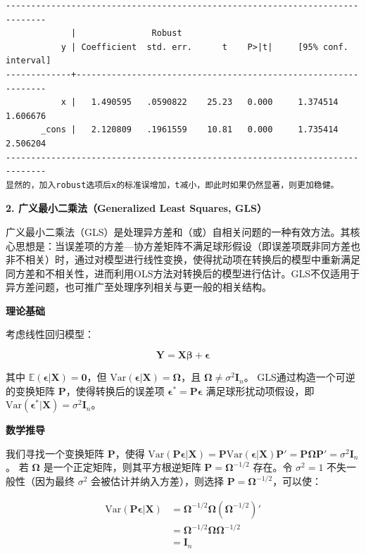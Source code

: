 \begin{tcolorbox}[title=在 Stata 中解决异方差问题, colback=white, colframe=black, colbacktitle=white, coltitle=black,fonttitle=\bfseries]
\begin{Verbatim}[commandchars=\\\{\},xleftmargin=2em]
------------------------------------------------------------------------------
             |               Robust
           y | Coefficient  std. err.      t    P>|t|     [95% conf. interval]
-------------+----------------------------------------------------------------
           x |   1.490595   .0590822    25.23   0.000     1.374514    1.606676
       _cons |   2.120809   .1961559    10.81   0.000     1.735414    2.506204
------------------------------------------------------------------------------
显然的，加入robust选项后x的标准误增加，t减小，即此时如果仍然显著，则更加稳健。
	\end{Verbatim}
\end{tcolorbox}

\textbf{2. 广义最小二乘法（Generalized Least Squares, GLS）}

广义最小二乘法（GLS）是处理异方差和（或）自相关问题的一种有效方法。其核心思想是：当误差项的方差—协方差矩阵不满足球形假设（即误差项既非同方差也非不相关）时，通过对模型进行线性变换，使得扰动项在转换后的模型中重新满足同方差和不相关性，进而利用OLS方法对转换后的模型进行估计。GLS不仅适用于异方差问题，也可推广至处理序列相关与更一般的相关结构。

\textbf{理论基础}

考虑线性回归模型：

\begin{equation}
	\bm{Y} = \bm{X}\bm{\beta} + \bm{\epsilon}
\end{equation}

其中 $\mathbb{E}(\bm{\epsilon}|\bm{X}) = \bm{0}$，但 $\mathrm{Var}(\bm{\epsilon}|\bm{X}) = \bm{\Omega}$，且 $\bm{\Omega} \neq \sigma^2 \bm{I}_n$。
GLS通过构造一个可逆的变换矩阵 $\bm{P}$，使得转换后的误差项 $\bm{\epsilon}^* = \bm{P}\bm{\epsilon}$ 满足球形扰动项假设，即 $\mathrm{Var}(\bm{\epsilon}^*|\bm{X}) = \sigma^2 \bm{I}_n$。

\textbf{数学推导}

我们寻找一个变换矩阵 $\bm{P}$，使得 $\mathrm{Var}(\bm{P}\bm{\epsilon}|\bm{X}) = \bm{P}\mathrm{Var}(\bm{\epsilon}|\bm{X})\bm{P}' = \bm{P}\bm{\Omega}\bm{P}' = \sigma^2 \bm{I}_n$。
若 $\bm{\Omega}$ 是一个正定矩阵，则其平方根逆矩阵 $\bm{P} = \bm{\Omega}^{-1/2}$ 存在。令 $\sigma^2=1$ 不失一般性（因为最终 $\sigma^2$ 会被估计并纳入方差），则选择 $\bm{P} = \bm{\Omega}^{-1/2}$，可以使：

\begin{equation}
	\begin{split}
		\mathrm{Var}(\bm{P}\bm{\epsilon}|\bm{X}) &= \bm{\Omega}^{-1/2} \bm{\Omega} (\bm{\Omega}^{-1/2})' \\
		&= \bm{\Omega}^{-1/2} \bm{\Omega} \bm{\Omega}^{-1/2} \\
		&= \bm{I}_n
	\end{split}
\end{equation}

